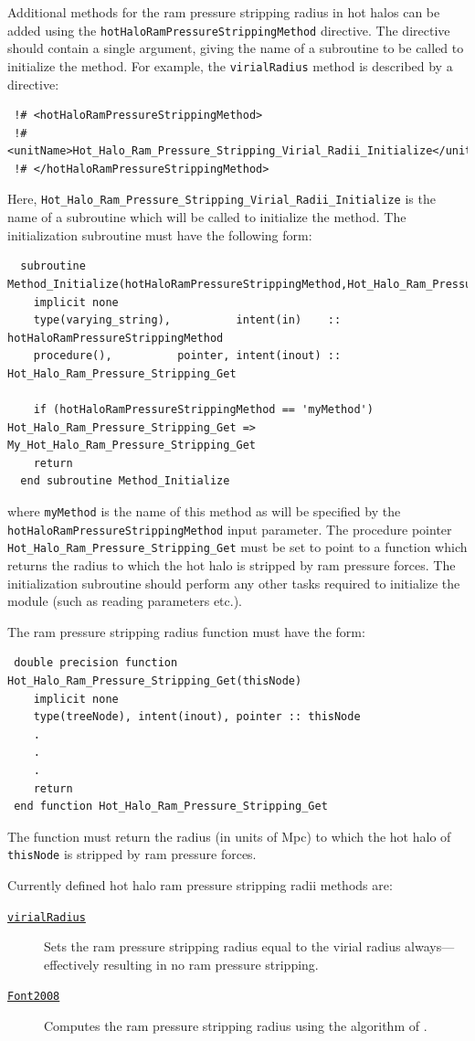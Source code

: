 Additional methods for the ram pressure stripping radius in hot halos can be added using the {\tt hotHaloRamPressureStrippingMethod} directive. The directive should contain a single argument, giving the name of a subroutine to be called to initialize the method. For example, the {\tt virialRadius} method is described by a directive:
\begin{verbatim}
 !# <hotHaloRamPressureStrippingMethod>
 !#  <unitName>Hot_Halo_Ram_Pressure_Stripping_Virial_Radii_Initialize</unitName>
 !# </hotHaloRamPressureStrippingMethod>
\end{verbatim}
Here, {\tt Hot\_Halo\_Ram\_Pressure\_Stripping\_Virial\_Radii\_Initialize} is the name of a subroutine which will be called to initialize the method. The initialization subroutine must have the following form:
\begin{verbatim}
  subroutine Method_Initialize(hotHaloRamPressureStrippingMethod,Hot_Halo_Ram_Pressure_Stripping_Get)
    implicit none
    type(varying_string),          intent(in)    :: hotHaloRamPressureStrippingMethod
    procedure(),          pointer, intent(inout) :: Hot_Halo_Ram_Pressure_Stripping_Get
    
    if (hotHaloRamPressureStrippingMethod == 'myMethod') Hot_Halo_Ram_Pressure_Stripping_Get => My_Hot_Halo_Ram_Pressure_Stripping_Get
    return
  end subroutine Method_Initialize
\end{verbatim}
where {\tt myMethod} is the name of this method as will be specified by the {\tt hotHaloRamPressureStrippingMethod} input parameter. The procedure pointer {\tt Hot\_Halo\_Ram\_Pressure\_Stripping\_Get} must be set to point to a function which returns the radius to which the hot halo is stripped by ram pressure forces. The initialization subroutine should perform any other tasks required to initialize the module (such as reading parameters etc.).

The ram pressure stripping radius function must have the form:
\begin{verbatim}
 double precision function Hot_Halo_Ram_Pressure_Stripping_Get(thisNode)
    implicit none
    type(treeNode), intent(inout), pointer :: thisNode
    .
    .
    .
    return
 end function Hot_Halo_Ram_Pressure_Stripping_Get
\end{verbatim}
The function must return the radius (in units of Mpc) to which the hot halo of {\tt thisNode} is stripped by ram pressure forces.

Currently defined hot halo ram pressure stripping radii methods are:
\begin{description}
 \item [\hyperlink{hot_halo.ram_pressure_stripping.virial_radius.F90:hot_halo_ram_pressure_stripping_virial_radii:hot_halo_ram_pressure_stripping_virial_radius}{{\tt virialRadius}}] Sets the ram pressure stripping radius equal to the virial radius always---effectively resulting in no ram pressure stripping.
 \item [\hyperlink{hot_halo.ram_pressure_stripping.Font2008.F90:hot_halo_ram_pressure_stripping_font2008:hot_halo_ram_pressure_stripping_font2008_get}{{\tt Font2008}}] Computes the ram pressure stripping radius using the algorithm of \cite{font_colours_2008}.
\end{description}

